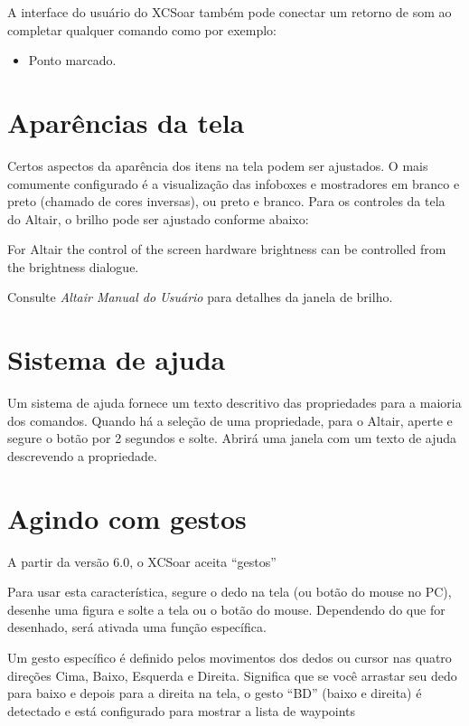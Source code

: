 A interface do usuário do XCSoar também pode conectar um retorno de som ao completar qualquer comando como por exemplo:
\begin{itemize}
\item Ponto marcado.
\end{itemize}


\section{Aparências da tela}

Certos aspectos da aparência dos itens na tela podem ser ajustados.  O mais comumente configurado é a visualização das infoboxes e mostradores em branco e preto (chamado de cores inversas), ou preto e branco.
Para os controles da tela do Altair, o brilho pode ser ajustado conforme abaixo:


For Altair the control of the screen hardware 
brightness can be controlled from the brightness dialogue.
\begin{quote}
\blink{}
\end{quote}

Consulte {\em Altair Manual do Usuário} para detalhes da janela de brilho.


\section{Sistema de ajuda}

Um sistema de ajuda fornece um texto descritivo das propriedades para a maioria dos comandos.  Quando há a seleção de uma propriedade, para o Altair, aperte e segure o botão  por 2 segundos e solte. Abrirá uma janela com um texto de ajuda descrevendo a propriedade.  

\section{Agindo com gestos}\label{sec:gestures}
A partir da versão 6.0, o XCSoar aceita “gestos”

Para usar esta característica, segure o dedo na tela (ou botão do mouse no PC), desenhe uma figura e solte a tela ou o botão do mouse.  Dependendo do que for desenhado, será ativada uma função específica. 

Um gesto específico é definido pelos movimentos dos dedos ou cursor nas quatro direções Cima, Baixo, Esquerda e Direita.  Significa que se você arrastar seu dedo para baixo e depois para a direita na tela,  o gesto “BD” (baixo e direita) é detectado e está configurado para mostrar a lista de waypoints
 
